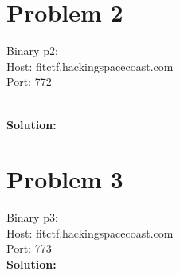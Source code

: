 \documentclass[10.9pt]{article}
\newcommand\tab[1][0.5cm]{\hspace*{#1}}
\begin{document}
\section{Problem 2}
Binary p2: \\ Host: fitctf.hackingspacecoast.com \\ Port: 772

\textbf{\\Solution:\\}
\tab 

\section{Problem 3}
Binary p3: \\ Host: fitctf.hackingspacecoast.com \\ Port: 773
\textbf{\\Solution:\\}
\tab 
\end{document}
